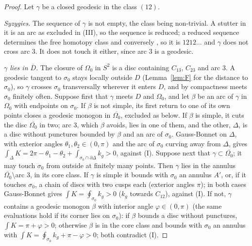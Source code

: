 \documentclass[11pt]{article}
\theoremstyle{definition}
\begin{document}
\begin{proof}
Let $\gamma$ be a closed geodesic in the class $(12)$.

\emph{Syzygies.} The sequence of $\gamma$ is not empty, the class being non-trivial. A stutter in it is an arc as
excluded in (III), so the sequence is reduced; a reduced sequence determines the free homotopy class and conversely \cite{M05}, so it is $1212\dots$ and
$\gamma$ does not cross arc $3$. It does not touch it either, since arc $3$ is a geodesic.

\emph{$\gamma$ lies in $\overline D$.} The closure of $\Omega_0$ in $S^2$ is a disc containing $C_{13}$, $C_{23}$ and arc
$3$. A geodesic tangent to $\sigma_0$ stays locally outside $D$ (Lemma~\ref{lem:F} for the distance to $\sigma_0$), so
$\gamma$ crosses $\sigma_0$ transversally wherever it enters $D$, and by compactness meets $\sigma_0$ finitely
often. Suppose first that $\gamma$ meets $D$ and $\Omega_0$, and let $\beta$ be an arc of $\gamma$ in $\Omega_0$ with
endpoints on $\sigma_0$. If $\beta$ is not simple, its first return to one of its own points closes a geodesic monogon
in $\overline{\Omega_0}$, excluded as below. If $\beta$ is simple, it cuts the disc $\overline{\Omega_0}$ in two; arc $3$, which $\beta$
avoids, lies in one of them, and the other, $\Delta$, is a disc without punctures bounded by $\beta$ and an arc of
$\sigma_0$. Gauss-Bonnet on $\Delta$, with exterior angles $\theta_1,\theta_2\in(0,\pi)$ and the arc of $\sigma_0$ curving
away from $\Delta$, gives $\int_\Delta K=2\pi-\theta_1-\theta_2+\int_{\sigma_0\cap\partial\Delta}k_g>0$, against (I).
Suppose next that $\gamma\subset\overline{\Omega_0}$; it may touch $\sigma_0$ from outside at finitely many points.
Then $\gamma$ lies in the annulus $\overline{\Omega_0}\setminus$arc $3$, in its core class. If $\gamma$ is simple it
bounds with $\sigma_0$ an annulus $A'$, or, if it touches $\sigma_0$, a chain of discs with two cusps each (exterior
angles $\pi$); in both cases Gauss-Bonnet gives $\int K=\oint_{\sigma_0}k_g>0$ ($k_g$ towards $C_{12}$), against (I).
If not, $\gamma$ contains a geodesic monogon $\beta$ with interior angle $\varphi\in(0,\pi)$ (the same evaluations hold
if its corner lies on $\sigma_0$): if $\beta$ bounds a disc without punctures,
$\int K=\pi+\varphi>0$; otherwise $\beta$ is in the core class and bounds with $\sigma_0$ an annulus with
$\int K=\oint_{\sigma_0}k_g+\pi-\varphi>0$; both contradict (I).


\end{proof}
\end{document}
